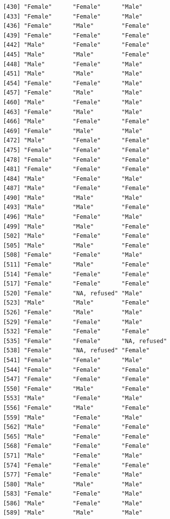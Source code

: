\documentclass{beamer}\usepackage[]{graphicx}\usepackage[]{color}
\makeatletter
\newenvironment{kframe}{%
 \def\at@end@of@kframe{}%
 \ifinner\ifhmode%
  \def\at@end@of@kframe{\end{minipage}}%
  \begin{minipage}{\columnwidth}%
 \fi\fi%
 \def\FrameCommand##1{\hskip\@totalleftmargin \hskip-\fboxsep
 \colorbox{shadecolor}{##1}\hskip-\fboxsep
     \hskip-\linewidth \hskip-\@totalleftmargin \hskip\columnwidth}%
 \MakeFramed {\advance\hsize-\width
   \@totalleftmargin\z@ \linewidth\hsize
   \@setminipage}}%
 {\par\unskip\endMakeFramed%
 \at@end@of@kframe}
\newenvironment{knitrout}{}{} %
\makeatother
\begin{document}
\begin{frame}[fragile]
\begin{knitrout}
\begin{kframe}
\begin{verbatim}
 [430] "Female"      "Female"      "Male"       
 [433] "Female"      "Female"      "Male"       
 [436] "Female"      "Male"        "Female"     
 [439] "Female"      "Female"      "Female"     
 [442] "Male"        "Female"      "Female"     
 [445] "Male"        "Male"        "Female"     
 [448] "Male"        "Female"      "Male"       
 [451] "Male"        "Male"        "Male"       
 [454] "Female"      "Female"      "Male"       
 [457] "Female"      "Male"        "Male"       
 [460] "Male"        "Female"      "Male"       
 [463] "Female"      "Male"        "Male"       
 [466] "Male"        "Female"      "Female"     
 [469] "Female"      "Male"        "Male"       
 [472] "Male"        "Female"      "Female"     
 [475] "Female"      "Female"      "Female"     
 [478] "Female"      "Female"      "Female"     
 [481] "Female"      "Female"      "Female"     
 [484] "Male"        "Female"      "Male"       
 [487] "Male"        "Female"      "Female"     
 [490] "Male"        "Male"        "Male"       
 [493] "Male"        "Male"        "Female"     
 [496] "Male"        "Female"      "Male"       
 [499] "Male"        "Male"        "Female"     
 [502] "Male"        "Female"      "Female"     
 [505] "Male"        "Male"        "Female"     
 [508] "Female"      "Female"      "Male"       
 [511] "Female"      "Male"        "Female"     
 [514] "Female"      "Female"      "Female"     
 [517] "Female"      "Female"      "Female"     
 [520] "Female"      "NA, refused" "Male"       
 [523] "Male"        "Male"        "Female"     
 [526] "Female"      "Male"        "Male"       
 [529] "Female"      "Female"      "Male"       
 [532] "Female"      "Female"      "Female"     
 [535] "Female"      "Female"      "NA, refused"
 [538] "Female"      "NA, refused" "Female"     
 [541] "Female"      "Female"      "Male"       
 [544] "Female"      "Female"      "Female"     
 [547] "Female"      "Female"      "Female"     
 [550] "Female"      "Male"        "Female"     
 [553] "Male"        "Female"      "Male"       
 [556] "Female"      "Male"        "Female"     
 [559] "Male"        "Female"      "Male"       
 [562] "Male"        "Female"      "Female"     
 [565] "Male"        "Female"      "Female"     
 [568] "Female"      "Female"      "Female"     
 [571] "Male"        "Female"      "Male"       
 [574] "Female"      "Female"      "Female"     
 [577] "Female"      "Female"      "Male"       
 [580] "Male"        "Male"        "Male"       
 [583] "Female"      "Female"      "Male"       
 [586] "Male"        "Female"      "Male"       
 [589] "Male"        "Male"        "Male"       

\end{verbatim}
\end{kframe}
\end{knitrout}
\end{frame}
\end{document}
